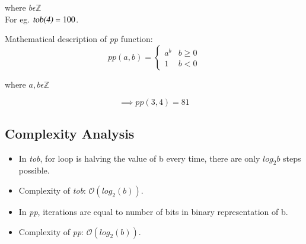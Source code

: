 \documentclass[journal,12pt,twocolumn]{IEEEtran}
\begin{document}
\begin{center}
    where $b \epsilon \mathbb{Z}$ \\
    \vspace{0.5cm}
For eg. $\textsl{tob(4)} = 100 $.
\end{center}

Mathematical description of \textsl{pp} function:
\[ pp(a, b) = 
\begin{cases} 
a^b & b \geq 0 \\
1 & b < 0
\end{cases}
\]

\begin{center}
where $a, b \epsilon \mathbb{Z}$ 
\end{center}

\textbf{$$ \implies pp(3,4) = 81$$}

\subsection{Complexity Analysis}
\begin{itemize}   
    \item In \textit{tob}, for loop is halving the value of b every time, there are only $log_2{b}$ steps possible.
     \item Complexity of \textit{tob}: $\mathcal{O}(log_{2}(b))$. 
    \item In \textit{pp}, iterations are equal to number of bits in binary representation of b.
    \item Complexity of \textit{pp}: $\mathcal{O}(log_{2}(b))$.
\end{itemize}
\end{document}
